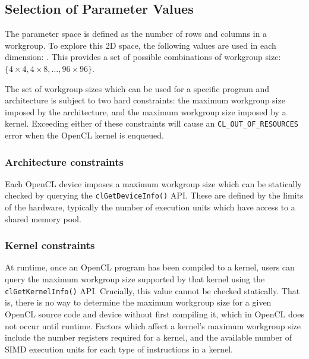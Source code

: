\subsection{Selection of Parameter Values}

The parameter space is defined as the number of rows and columns in a
workgroup. To explore this 2D space, the following values are used in
each dimension: . This provides a set of
 possible combinations of workgroup size:
$\{ 4\times4, 4\times8, \ldots, 96\times96 \}$. 


The set of workgroup sizes which can be used for a specific program
and architecture is subject to two hard constraints: the maximum
workgroup size imposed by the architecture, and the maximum workgroup
size imposed by a kernel. Exceeding either of these constraints will
cause an \texttt{CL\_OUT\_OF\_RESOURCES} error when the OpenCL kernel
is enqueued.

\subsubsection{Architecture constraints}

Each OpenCL device imposes a maximum workgroup size which can be
statically checked by querying the \texttt{clGetDeviceInfo()}
API. These are defined by the limits of the hardware, typically the
number of execution units which have access to a shared memory pool.

\subsubsection{Kernel constraints}

At runtime, once an OpenCL program has been compiled to a kernel,
users can query the maximum workgroup size supported by that kernel
using the \texttt{clGetKernelInfo()} API. Crucially, this value cannot
be checked statically. That is, there is no way to determine the
maximum workgroup size for a given OpenCL source code and device
without first compiling it, which in OpenCL does not occur until
runtime. Factors which affect a kernel's maximum workgroup size
include the number registers required for a kernel, and the available
number of SIMD execution units for each type of instructions in a
kernel.


